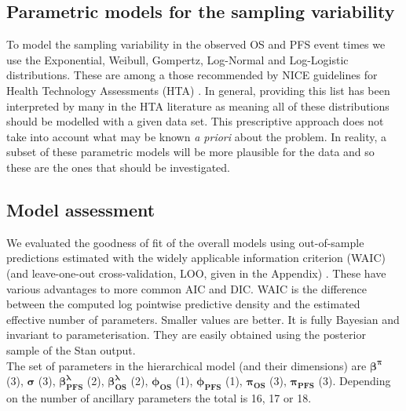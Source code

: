 \documentclass[AMA,STIX1COL]{WileyNJD-v2}
\begin{document}
%
\subsection{Parametric models for the sampling variability}
To model the sampling variability in the observed OS and PFS event times we use the Exponential, Weibull, Gompertz, Log-Normal and Log-Logistic distributions. These are among a those recommended by NICE guidelines for Health Technology Assessments (HTA) \cite{Latimer2011}.
In general, providing this list has been interpreted by many in the HTA literature as meaning all of these distributions should be modelled with a given data set.
This prescriptive approach does not take into account what may be known {\it a priori} about the problem.
In reality, a subset of these parametric models will be more plausible for the data and so these are the ones that should be investigated.

%
\subsection{Model assessment}
We evaluated the goodness of fit of the overall models using out-of-sample predictions estimated with the widely applicable information criterion (WAIC) (and leave-one-out cross-validation, LOO, given in the Appendix) \cite{Vehtari2017}. These have various advantages to more common AIC and DIC. WAIC is the difference between the computed log pointwise predictive density and the estimated effective number of parameters. Smaller values are better. It is fully Bayesian and invariant to parameterisation. They are easily obtained using the posterior sample of the Stan output.\\
The set of parameters in the hierarchical model (and their dimensions) are
$\mathbf{\beta^{\pi}}$ (3), $\mathbf{\sigma}$ (3), $\mathbf{\beta^{\lambda}_{PFS}}$ (2), $\mathbf{\beta^{\lambda}_{OS}}$ (2), $\mathbf{\phi_{OS}}$ (1), $\mathbf{\phi_{PFS}}$ (1), $\mathbf{\pi_{OS}}$ (3), $\mathbf{\pi_{PFS}}$ (3).
Depending on the number of ancillary parameters the total is 16, 17 or 18.

\end{document}
